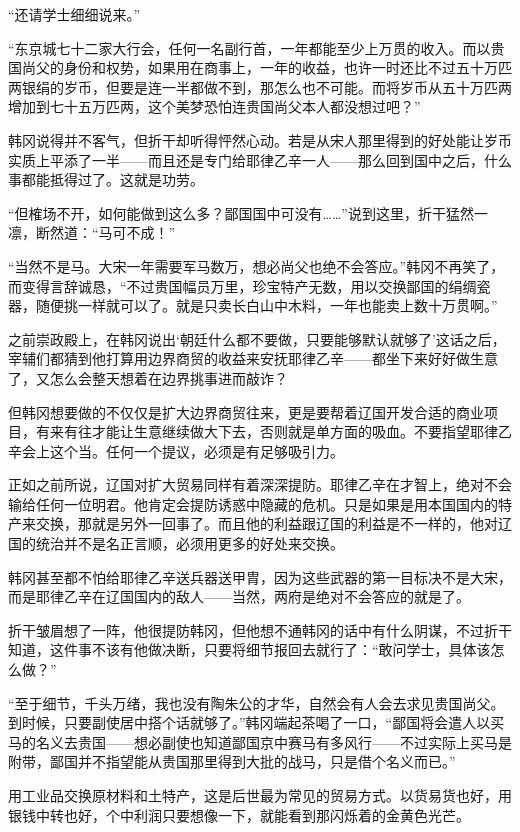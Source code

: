 “还请学士细细说来。”

“东京城七十二家大行会，任何一名副行首，一年都能至少上万贯的收入。而以贵国尚父的身份和权势，如果用在商事上，一年的收益，也许一时还比不过五十万匹两银绢的岁币，但要是连一半都做不到，那怎么也不可能。而将岁币从五十万匹两增加到七十五万匹两，这个美梦恐怕连贵国尚父本人都没想过吧？”

韩冈说得并不客气，但折干却听得怦然心动。若是从宋人那里得到的好处能让岁币实质上平添了一半——而且还是专门给耶律乙辛一人——那么回到国中之后，什么事都能抵得过了。这就是功劳。

“但榷场不开，如何能做到这么多？鄙国国中可没有……”说到这里，折干猛然一凛，断然道：“马可不成！”

“当然不是马。大宋一年需要军马数万，想必尚父也绝不会答应。”韩冈不再笑了，而变得言辞诚恳，“不过贵国幅员万里，珍宝特产无数，用以交换鄙国的绢绸瓷器，随便挑一样就可以了。就是只卖长白山中木料，一年也能卖上数十万贯啊。”

之前崇政殿上，在韩冈说出‘朝廷什么都不要做，只要能够默认就够了’这话之后，宰辅们都猜到他打算用边界商贸的收益来安抚耶律乙辛——都坐下来好好做生意了，又怎么会整天想着在边界挑事进而敲诈？

但韩冈想要做的不仅仅是扩大边界商贸往来，更是要帮着辽国开发合适的商业项目，有来有往才能让生意继续做大下去，否则就是单方面的吸血。不要指望耶律乙辛会上这个当。任何一个提议，必须是有足够吸引力。

正如之前所说，辽国对扩大贸易同样有着深深提防。耶律乙辛在才智上，绝对不会输给任何一位明君。他肯定会提防诱惑中隐藏的危机。只是如果是用本国国内的特产来交换，那就是另外一回事了。而且他的利益跟辽国的利益是不一样的，他对辽国的统治并不是名正言顺，必须用更多的好处来交换。

韩冈甚至都不怕给耶律乙辛送兵器送甲胄，因为这些武器的第一目标决不是大宋，而是耶律乙辛在辽国国内的敌人——当然，两府是绝对不会答应的就是了。

折干皱眉想了一阵，他很提防韩冈，但他想不通韩冈的话中有什么阴谋，不过折干知道，这件事不该有他做决断，只要将细节报回去就行了：“敢问学士，具体该怎么做？”

“至于细节，千头万绪，我也没有陶朱公的才华，自然会有人会去求见贵国尚父。到时候，只要副使居中搭个话就够了。”韩冈端起茶喝了一口，“鄙国将会遣人以买马的名义去贵国——想必副使也知道鄙国京中赛马有多风行——不过实际上买马是附带，鄙国并不指望能从贵国那里得到大批的战马，只是借个名义而已。”

用工业品交换原材料和土特产，这是后世最为常见的贸易方式。以货易货也好，用银钱中转也好，个中利润只要想像一下，就能看到那闪烁着的金黄色光芒。

